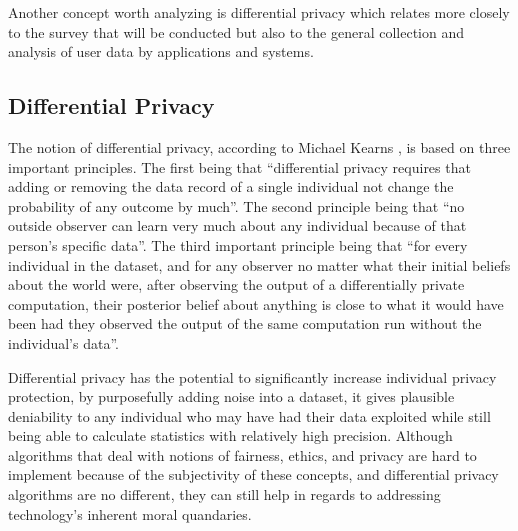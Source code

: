 \documentclass[conference]{IEEEtran}
\begin{document}
Another concept worth analyzing is differential privacy which relates more
closely to the survey that will be conducted but also to the general
collection and analysis of user data by applications and systems.

\subsection{Differential Privacy}

The notion of differential privacy, according to Michael Kearns \cite{kearns2019ethical},
is based on three important principles. The first being that ``differential
privacy requires that adding or removing the data record of a single individual
not change the probability of any outcome by much''. The second principle
being that ``no outside observer can learn very much about any individual
because of that person's specific data''. The third important principle
being that ``for every individual in the dataset, and for any observer no
matter what their initial beliefs about the world were, after observing
the output of a differentially private computation, their posterior belief
about anything is close to what it would have been had they observed the
output of the same computation run without the individual's data''.

Differential privacy has the potential to significantly increase individual
privacy protection, by purposefully adding noise into a dataset, it gives
plausible deniability to any individual who may have had their data exploited
while still being able to calculate statistics with relatively high precision.
Although algorithms that deal with notions of fairness, ethics, and privacy
are hard to implement because of the subjectivity of these concepts, and
differential privacy algorithms are no different, they can still help in
regards to addressing technology's inherent moral quandaries.
\end{document}
